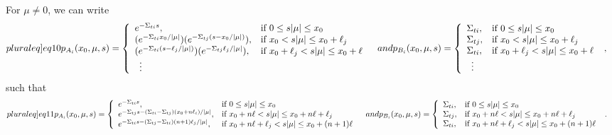 \documentclass[12pt]{article}
\begin{document}
For $\mu\neq 0$, we can write
\begin{subequations}\label[pluraleq]{eq10}
\begin{align}
p_{A_i}(x_0,\mu,s) &=  \left\{
\begin{array}{ll}
e^{-\Sigma_{ti}s}, & \text{if } 0\leq s|\mu|\leq x_0\\
(e^{-\Sigma_{ti}x_0/|\mu|})(e^{-\Sigma_{tj}(s-x_0/|\mu|)}), &\text{if } x_0< s|\mu|\leq x_0+\ell_j\\
(e^{-\Sigma_{ti}(s-\ell_j/|\mu|)})(e^{-\Sigma_{tj}\ell_j/|\mu|}), &\text{if } x_0+\ell_j< s|\mu|\leq x_0+\ell\\
\,\,\,\vdots & 
\end{array}
\right.
\end{align}
and
\begin{align}
p_{B_i}(x_0,\mu,s) &=  \left\{
\begin{array}{ll}
\Sigma_{ti}, & \text{if } 0\leq s|\mu|\leq x_0\\
\Sigma_{tj}, &\text{if } x_0< s|\mu|\leq x_0+\ell_j\\
\Sigma_{ti}, &\text{if } x_0+\ell_j< s|\mu|\leq x_0+\ell\\
\,\,\,\vdots & 
\end{array}
\right.
\,\,,
\end{align}
\end{subequations}
such that
\begin{subequations}\label[pluraleq]{eq11}
\begin{align}
p_{A_i}(x_0,\mu,s) &=  \left\{
\begin{array}{ll}
e^{-\Sigma_{ti}s}, & \text{if } 0\leq s|\mu|\leq x_0  \\
e^{-\Sigma_{tj}s-(\Sigma_{ti}-\Sigma_{tj})(x_0+n\ell_i)/|\mu|}, & \text{if } x_0+n\ell< s|\mu|\leq  x_0+n\ell+\ell_j \\
e^{-\Sigma_{ti}s-(\Sigma_{tj}-\Sigma_{ti})(n+1)\ell_j/|\mu|}, & \text{if } x_0+n\ell+\ell_j< s|\mu|\leq x_0+(n+1)\ell
\end{array}
\right.
\end{align}
and
\begin{align}
p_{B_i}(x_0,\mu,s) &=  \left\{
\begin{array}{ll}
\Sigma_{ti}, & \text{if } 0\leq s|\mu|\leq x_0\\
\Sigma_{tj}, &\text{if } x_0+n\ell< s|\mu|\leq  x_0+n\ell+\ell_j\\
\Sigma_{ti}, &\text{if } x_0+n\ell+\ell_j< s|\mu|\leq x_0+(n+1)\ell
\end{array}
\right.
\,\,.
\end{align}
\end{subequations}
\end{document}
